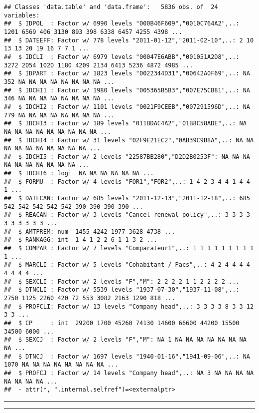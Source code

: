 \documentclass[
]{article}
\begin{document}
\begin{verbatim}
## Classes 'data.table' and 'data.frame':   5836 obs. of  24 variables:
##  $ IDPOL  : Factor w/ 6990 levels "000B46F609","0010C764A2",..: 1201 6569 406 3130 893 398 6338 6457 4255 4398 ...
##  $ DATEEFF: Factor w/ 778 levels "2011-01-12","2011-02-10",..: 2 10 13 13 20 19 16 7 7 1 ...
##  $ IDCLI  : Factor w/ 6979 levels "00047E6ABB","001051A2D8",..: 3272 2054 1020 1180 4209 2134 6413 5236 4872 4985 ...
##  $ IDPART : Factor w/ 1823 levels "0022344D31","00642A0F69",..: NA 352 NA NA NA NA NA NA NA NA ...
##  $ IDCHI1 : Factor w/ 1980 levels "005365B5B3","007E75CB81",..: NA 346 NA NA NA NA NA NA NA NA ...
##  $ IDCHI2 : Factor w/ 1101 levels "0021F9CEEB","007291596D",..: NA 779 NA NA NA NA NA NA NA NA ...
##  $ IDCHI3 : Factor w/ 189 levels "011BDAC4A2","01B8C58ADE",..: NA NA NA NA NA NA NA NA NA NA ...
##  $ IDCHI4 : Factor w/ 31 levels "02F9E21EC2","0AB39C9B8A",..: NA NA NA NA NA NA NA NA NA NA ...
##  $ IDCHI5 : Factor w/ 2 levels "22587BB280","D2D2B0253F": NA NA NA NA NA NA NA NA NA NA ...
##  $ IDCHI6 : logi  NA NA NA NA NA NA ...
##  $ FORMU  : Factor w/ 4 levels "FOR1","FOR2",..: 1 4 2 3 4 4 1 4 4 1 ...
##  $ DATECAN: Factor w/ 685 levels "2011-12-13","2011-12-18",..: 685 542 542 542 542 542 390 390 390 390 ...
##  $ REACAN : Factor w/ 3 levels "Cancel renewal policy",..: 3 3 3 3 3 3 3 3 3 3 ...
##  $ AMTPREM: num  1455 4242 1977 3628 4738 ...
##  $ RANKAGG: int  1 4 1 2 2 6 1 1 3 2 ...
##  $ COMPAR : Factor w/ 7 levels "Comparateur1",..: 1 1 1 1 1 1 1 1 1 1 ...
##  $ MARCLI : Factor w/ 5 levels "Cohabitant / Pacs",..: 4 2 4 4 4 4 4 4 4 4 ...
##  $ SEXCLI : Factor w/ 2 levels "F","M": 2 2 2 2 1 1 2 2 2 2 ...
##  $ DTNCLI : Factor w/ 5539 levels "1937-07-30","1937-11-08",..: 2750 1125 2260 420 72 553 3082 2163 1290 818 ...
##  $ PROFCLI: Factor w/ 13 levels "Company head",..: 3 3 3 3 8 3 3 12 3 3 ...
##  $ CP     : int  29200 1700 45260 74130 14600 66600 44200 15500 34500 6000 ...
##  $ SEXCJ  : Factor w/ 2 levels "F","M": NA 1 NA NA NA NA NA NA NA NA ...
##  $ DTNCJ  : Factor w/ 1697 levels "1940-01-16","1941-09-06",..: NA 1070 NA NA NA NA NA NA NA NA ...
##  $ PROFCJ : Factor w/ 14 levels "Company head",..: NA 3 NA NA NA NA NA NA NA NA ...
##  - attr(*, ".internal.selfref")=<externalptr>
\end{verbatim}

\begin{center}\rule{0.5\linewidth}{0.5pt}\end{center}

\begin{center}\rule{0.5\linewidth}{0.5pt}\end{center}
\end{document}
